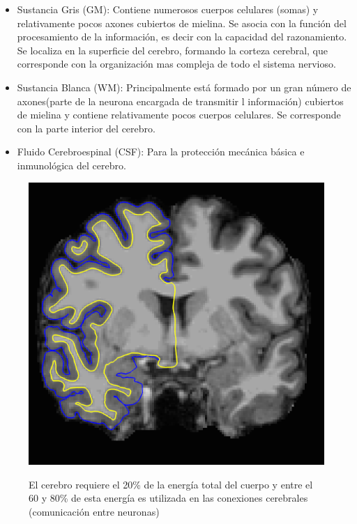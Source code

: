 \begin{itemize}
	\item Sustancia Gris (GM): Contiene numerosos cuerpos celulares (somas) y relativamente pocos axones cubiertos de mielina. Se asocia con la función del procesamiento de la información, es decir con la capacidad del razonamiento. Se localiza en la superficie del cerebro, formando la corteza cerebral, que corresponde con la organización mas compleja de todo el sistema nervioso.
	\item Sustancia Blanca (WM): Principalmente está formado por un gran número de axones(parte de la neurona encargada de transmitir l información) cubiertos de mielina y contiene relativamente pocos cuerpos celulares. Se corresponde con la parte interior del cerebro.
	\item Fluido Cerebroespinal (CSF): Para la protección mecánica básica e inmunológica del cerebro.
\end{itemize} 

\begin{figure}[H]
  \centering
    \includegraphics[scale=0.60]{img/tejidos.png}\label{eda:tejidos}
  \caption{El cerebro requiere el 20\% de la energía total del cuerpo y entre el 60 y 80\% de esta energía es utilizada en las conexiones cerebrales (comunicación entre neuronas)}
\end{figure}

\cite{brainhack}

